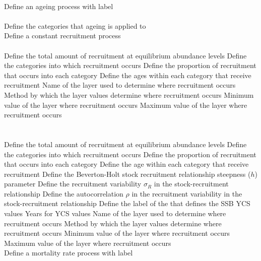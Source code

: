 \\  {Define an ageing process with label}\\ \\
 {Define the categories that ageing is applied to}
\\  {Define a constant recruitment process}\\ \\
 {Define the total amount of recruitment at equilibrium abundance levels}
 {Define the categories into which recruitment occurs}
 {Define the proportion of recruitment that occurs into each category}
 {Define the ages within each category that receive recruitment}
 {Name of the layer used to determine where recruitment occurs}
 {Method by which the layer values determine where recruitment occurs}
 {Minimum value of the layer where recruitment occurs}
 {Maximum value of the layer where recruitment occurs}
\\ \\ \\
 {Define the total amount of recruitment at equilibrium abundance levels}
 {Define the categories into which recruitment occurs}
 {Define the proportion of recruitment that occurs into each category}
 {Define the age within each category that receive recruitment}
 {Define the Beverton-Holt stock recruitment relationship steepness ($h$) parameter}
 {Define the recruitment variability $\sigma_R$ in the stock-recruitment relationship}
 {Define the autocorrelation $\rho$ in the recruitment variability in the stock-recruitment relationship}
 {Define the label of the  that defines the SSB}
 {YCS values}
 {Years for YCS values}
 {Name of the layer used to determine where recruitment occurs}
 {Method by which the layer values determine where recruitment occurs}
 {Minimum value of the layer where recruitment occurs}
 {Maximum value of the layer where recruitment occurs}
\\  {Define a mortality rate process with label}\\ \\
